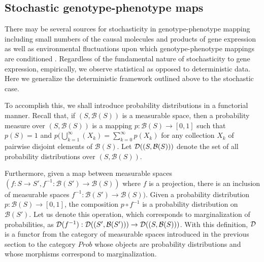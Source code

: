 \subsection{Stochastic genotype-phenotype maps}\label{sec:sgpm}
There may be several sources for stochasticity in genotype-phenotype mapping including small numbers of the causal molecules and products of gene expression as well as environmental fluctuations upon which genotype-phenotype mappings are conditioned \cite{Swain2002,Paulsson2004,Thattai2004,Acar2008a,Lestas2010,Munsky2012,Chalancon2012,Neuert2013,Sanchez2013}. Regardless of the fundamental nature of stochasticity to gene expression, empirically, we observe statistical as opposed to deterministic data. Here we generalize the deterministic framework outlined above to the stochastic case.

To accomplish this, we shall introduce probability distributions in a functorial manner.  Recall that, if $(S,\mathcal{B}(S))$ is a measurable space, then a probability measure over $(S,\mathcal{B}(S))$ is a mapping $p \colon \mathcal{B}(S) \to [0,1]$ such that $p(S) = 1$ and $p(\bigcup_{k=1}^\infty (X_k) = \sum_{k=0}^\infty p(X_k)$ for any collection $X_k$ of pairwise disjoint elements of $\mathcal{B}(S)$.  Let $\mathcal{D}((S,\mathcal{B}(S)))$ denote the set of all probability distributions over $(S,\mathcal{B}(S))$.

Furthermore, given a map between measurable spaces $(f:S \rightarrow S', f^{-1} : \mathcal{B}(S') \rightarrow \mathcal{B}(S))$ where $f$ is a projection, there is an inclusion of measurable spaces $f^{-1} : \mathcal{B}(S') \rightarrow \mathcal{B}(S))$. Given a probability distribution $p \colon \mathcal{B}(S) \to [0,1]$, the composition $p \circ f^{-1}$ is a probability distribution on $\mathcal{B}(S')$.  Let us denote this operation, which corresponds to marginalization of probabilities, as $\mathcal{D}(f^{-1}) : \mathcal{D}((S',\mathcal{B}(S'))) \to \mathcal{D}((S,\mathcal{B}(S)))$.  With this definition, $\mathcal{D}$ is a functor from the category of measurable spaces introduced in the previous section to the category $Prob$ whose objects are probability distributions and whose morphisms correspond to marginalization.


